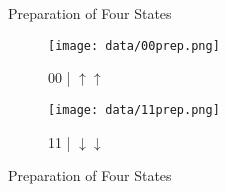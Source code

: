 \documentclass{beamer}
\begin{document}
\begin{frame}{Preparation of Four States}
	\begin{figure}
	\begin{minipage}[c]{.2\textwidth}
		\caption*{00 | $\uparrow \uparrow$}
	\end{minipage}%
	\begin{minipage}[c]{.8\textwidth}
		\texttt{[image: data/00prep.png]}
	\end{minipage}
	\end{figure}
	\begin{figure}
	\begin{minipage}[c]{.2\textwidth}
		\caption*{11 | $\downarrow \downarrow$}
	\end{minipage}%
	\begin{minipage}[c]{.8\textwidth}
		\texttt{[image: data/11prep.png]}
	\end{minipage}
	\end{figure}
\end{frame}

\begin{frame}{Preparation of Four States}
	\vspace{-2em}
	\begin{figure}
		\\
	\end{figure}
\end{frame}
\end{document}

